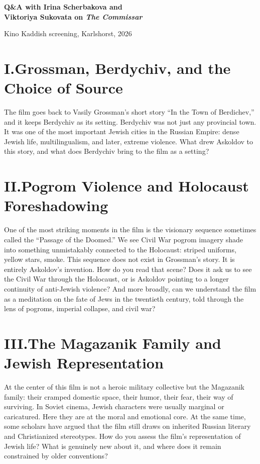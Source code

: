 \documentclass[11pt,a4paper]{article}
\begin{document}
{\Large\bfseries Q\&A with Irina Scherbakova and\\ Viktoriya Sukovata on \textit{The Commissar}}

\smallskip

{\small Kino Kaddish screening, Karlshorst, 2026}

\bigskip

\section*{I.\quad Grossman, Berdychiv, and the Choice of Source}

The film goes back to Vasily Grossman's short story ``In the Town of Berdichev,'' and it keeps Berdychiv as its setting. Berdychiv was not just any provincial town. It was one of the most important Jewish cities in the Russian Empire: dense Jewish life, multilingualism, and later, extreme violence. What drew Askoldov to this story, and what does Berdychiv bring to the film as a setting?

\section*{II.\quad Pogrom Violence and Holocaust Foreshadowing}

One of the most striking moments in the film is the visionary sequence sometimes called the ``Passage of the Doomed.'' We see Civil War pogrom imagery shade into something unmistakably connected to the Holocaust: striped uniforms, yellow stars, smoke. This sequence does not exist in Grossman's story. It is entirely Askoldov's invention. How do you read that scene? Does it ask us to see the Civil War through the Holocaust, or is Askoldov pointing to a longer continuity of anti-Jewish violence? And more broadly, can we understand the film as a meditation on the fate of Jews in the twentieth century, told through the lens of pogroms, imperial collapse, and civil war?

\section*{III.\quad The Magazanik Family and Jewish Representation}

At the center of this film is not a heroic military collective but the Magazanik family: their cramped domestic space, their humor, their fear, their way of surviving. In Soviet cinema, Jewish characters were usually marginal or caricatured. Here they are at the moral and emotional core. At the same time, some scholars have argued that the film still draws on inherited Russian literary and Christianized stereotypes. How do you assess the film's representation of Jewish life? What is genuinely new about it, and where does it remain constrained by older conventions?
\end{document}
